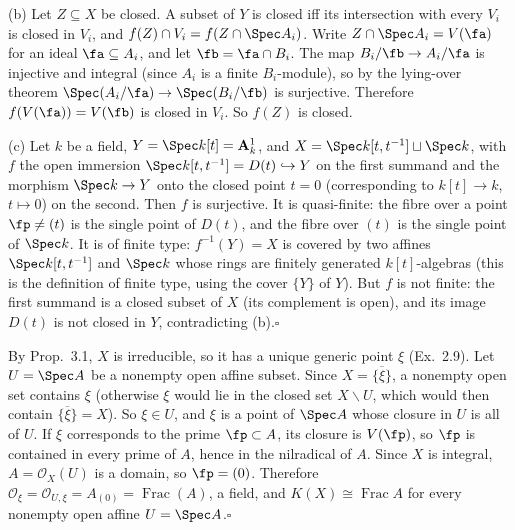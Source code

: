 \documentclass[11pt]{article}
\begin{document}
(b) Let $Z\subseteq X$ be closed. A subset of $Y$ is closed iff its intersection with every $V_i$ is closed in $V_i$, and $f(Z)\cap V_i=f(Z\cap\Spec A_i)$. Write $Z\cap\Spec A_i=V(\fa)$ for an ideal $\fa\subseteq A_i$, and let $\fb=\fa\cap B_i$. The map $B_i/\fb\to A_i/\fa$ is injective and integral (since $A_i$ is a finite $B_i$-module), so by the lying-over theorem $\Spec(A_i/\fa)\to\Spec(B_i/\fb)$ is surjective. Therefore $f(V(\fa))=V(\fb)$ is closed in $V_i$. So $f(Z)$ is closed.

(c) Let $k$ be a field, $Y=\Spec k[t]=\mathbf A^1_k$, and $X=\Spec k[t,t^{-1}]\sqcup\Spec k$, with $f$ the open immersion $\Spec k[t,t^{-1}]=D(t)\hookrightarrow Y$ on the first summand and the morphism $\Spec k\to Y$ onto the closed point $t=0$ (corresponding to $k[t]\to k$, $t\mapsto0$) on the second. Then $f$ is surjective. It is quasi-finite: the fibre over a point $\fp\ne(t)$ is the single point of $D(t)$, and the fibre over $(t)$ is the single point of $\Spec k$. It is of finite type: $f^{-1}(Y)=X$ is covered by two affines $\Spec k[t,t^{-1}]$ and $\Spec k$ whose rings are finitely generated $k[t]$-algebras (this is the definition of finite type, using the cover $\{Y\}$ of $Y$). But $f$ is not finite: the first summand is a closed subset of $X$ (its complement is open), and its image $D(t)$ is not closed in $Y$, contradicting (b).\hfill$\square$

\pf
By Prop.~3.1, $X$ is irreducible, so it has a unique generic point $\xi$ (Ex.~2.9). Let $U=\Spec A$ be a nonempty open affine subset. Since $X=\overline{\{\xi\}}$, a nonempty open set contains $\xi$ (otherwise $\xi$ would lie in the closed set $X\smallsetminus U$, which would then contain $\overline{\{\xi\}}=X$). So $\xi\in U$, and $\xi$ is a point of $\Spec A$ whose closure in $U$ is all of $U$. If $\xi$ corresponds to the prime $\fp\subset A$, its closure is $V(\fp)$, so $\fp$ is contained in every prime of $A$, hence in the nilradical of $A$. Since $X$ is integral, $A=\mathcal O_X(U)$ is a domain, so $\fp=(0)$. Therefore $\mathcal O_\xi=\mathcal O_{U,\xi}=A_{(0)}=\operatorname{Frac}(A)$, a field, and $K(X)\cong\operatorname{Frac}A$ for every nonempty open affine $U=\Spec A$.\hfill$\square$
\end{document}
